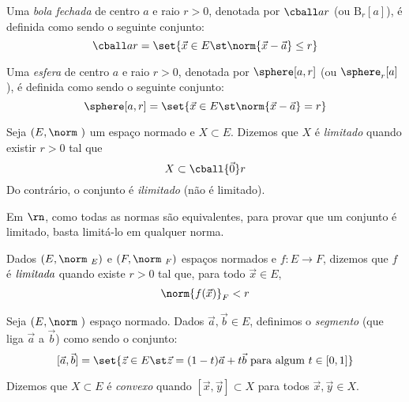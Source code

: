 \begin{definition}
	Uma \emph{bola fechada}  de centro $a$ e raio $ r>0$,
	denotada por $\cball ar$ (ou $\mathrm B_r[a]$), é definida como sendo o seguinte conjunto:
	\begin{displaymath}
		\cball ar = \set{\vec x \in E \st \norm{\vec x - \vec a} \le r}
	\end{displaymath}
\end{definition}

\begin{definition}[Esfera]
	Uma \emph{esfera}  de centro $a$ e raio $ r>0$,
	denotada por $\sphere[a,r]$ (ou $\sphere_r[a]$), é definida como sendo o seguinte conjunto:
	\begin{displaymath}
		\sphere[a,r] = \set{\vec x \in E \st \norm{\vec x - \vec a} = r}
	\end{displaymath}
\end{definition}

\begin{definition}
	Seja $(E,\norm\ )$ um espaço normado e $X \subset E$. Dizemos que $X$ é \emph{limitado}
	quando existir $r>0$ tal que \[X \subset \cball {\vec 0}r\] Do contrário, o conjunto é 
	\emph{ilimitado} (não é limitado).
\end{definition}

\begin{remark}
	Em $\rn$, como todas as normas são equivalentes, para provar que um conjunto é limitado,
	basta limitá-lo em qualquer norma.
\end{remark}

\begin{definition}
	Dados $(E, \norm\ _E)$ e $(F, \norm\ _F)$ espaços normados e $f : E \to F$, dizemos que 
	$f$ é $\emph{limitada}$ quando existe $r>0$ tal que, para todo $\vec x \in E$, \[\norm{f(\vec x)}_F < r\]
\end{definition}

\begin{definition}[Segmento]
	Seja $(E, \norm\ )$ espaço normado. Dados $\vec a,\vec b\in E$, definimos o \emph{segmento} 
	(que liga $\vec a$ a $\vec b$) como sendo o conjunto:
	\[[\vec a, \vec b] = \set{\vec z \in E \st \vec z = (1-t)\vec a + t\vec b \text{ para algum }t\in[0,1]}\]
\end{definition}

\begin{definition}
	Dizemos que $X \subset E$ é \emph{convexo} quando $[\vec x, \vec y] \subset X$ para todos
	$\vec x,\vec y\in X$.
\end{definition}

